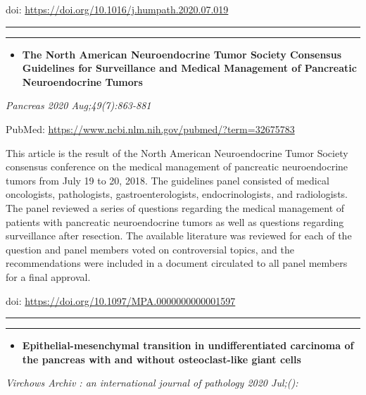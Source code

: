 \documentclass[
]{article}
\providecommand{\tightlist}{%
  \setlength{\itemsep}{0pt}\setlength{\parskip}{0pt}}
\begin{document}
doi: \url{https://doi.org/10.1016/j.humpath.2020.07.019}

\begin{center}\rule{0.5\linewidth}{0.5pt}\end{center}

\begin{center}\rule{0.5\linewidth}{0.5pt}\end{center}

\begin{itemize}
\tightlist
\item
  \textbf{The North American Neuroendocrine Tumor Society Consensus
  Guidelines for Surveillance and Medical Management of Pancreatic
  Neuroendocrine Tumors}
\end{itemize}

\emph{Pancreas 2020 Aug;49(7):863-881}

PubMed: \url{https://www.ncbi.nlm.nih.gov/pubmed/?term=32675783}

This article is the result of the North American Neuroendocrine Tumor
Society consensus conference on the medical management of pancreatic
neuroendocrine tumors from July 19 to 20, 2018. The guidelines panel
consisted of medical oncologists, pathologists, gastroenterologists,
endocrinologists, and radiologists. The panel reviewed a series of
questions regarding the medical management of patients with pancreatic
neuroendocrine tumors as well as questions regarding surveillance after
resection. The available literature was reviewed for each of the
question and panel members voted on controversial topics, and the
recommendations were included in a document circulated to all panel
members for a final approval.

doi: \url{https://doi.org/10.1097/MPA.0000000000001597}

\begin{center}\rule{0.5\linewidth}{0.5pt}\end{center}

\begin{center}\rule{0.5\linewidth}{0.5pt}\end{center}

\begin{itemize}
\tightlist
\item
  \textbf{Epithelial-mesenchymal transition in undifferentiated
  carcinoma of the pancreas with and without osteoclast-like giant
  cells}
\end{itemize}

\emph{Virchows Archiv : an international journal of pathology 2020
Jul;():}
\end{document}
